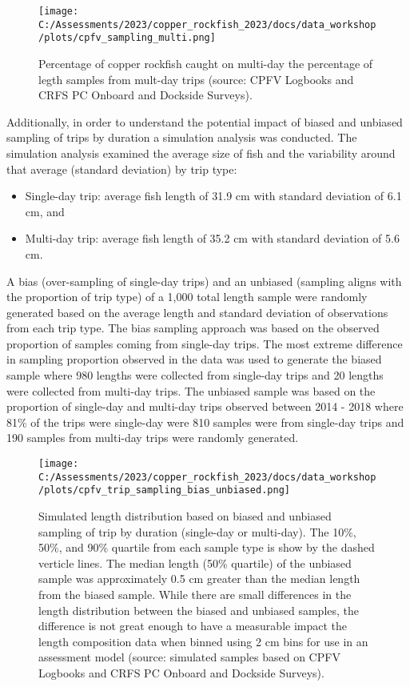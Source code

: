 \documentclass[
]{article}
\providecommand{\tightlist}{%
  \setlength{\itemsep}{0pt}\setlength{\parskip}{0pt}}
\begin{document}
\begin{figure}
\centering
\texttt{[image: C:/Assessments/2023/copper\_rockfish\_2023/docs/data\_workshop/plots/cpfv\_sampling\_multi.png]}
\caption{Percentage of copper rockfish caught on multi-day the
percentage of legth samples from mult-day trips (source: CPFV Logbooks
and CRFS PC Onboard and Dockside Surveys).\label{fig:cpfv-sampling}}
\end{figure}

Additionally, in order to understand the potential impact of biased and
unbiased sampling of trips by duration a simulation analysis was
conducted. The simulation analysis examined the average size of fish and
the variability around that average (standard deviation) by trip type:

\begin{itemize}
\tightlist
\item
  Single-day trip: average fish length of 31.9 cm with standard
  deviation of 6.1 cm, and
\item
  Multi-day trip: average fish length of 35.2 cm with standard deviation
  of 5.6 cm.
\end{itemize}

A bias (over-sampling of single-day trips) and an unbiased (sampling
aligns with the proportion of trip type) of a 1,000 total length sample
were randomly generated based on the average length and standard
deviation of observations from each trip type. The bias sampling
approach was based on the observed proportion of samples coming from
single-day trips. The most extreme difference in sampling proportion
observed in the data was used to generate the biased sample where 980
lengths were collected from single-day trips and 20 lengths were
collected from multi-day trips. The unbiased sample was based on the
proportion of single-day and multi-day trips observed between 2014 -
2018 where 81\% of the trips were single-day were 810 samples were from
single-day trips and 190 samples from multi-day trips were randomly
generated.

\begin{figure}
\centering
\texttt{[image: C:/Assessments/2023/copper\_rockfish\_2023/docs/data\_workshop/plots/cpfv\_trip\_sampling\_bias\_unbiased.png]}
\caption{Simulated length distribution based on biased and unbiased
sampling of trip by duration (single-day or multi-day). The 10\%, 50\%,
and 90\% quartile from each sample type is show by the dashed verticle
lines. The median length (50\% quartile) of the unbiased sample was
approximately 0.5 cm greater than the median length from the biased
sample. While there are small differences in the length distribution
between the biased and unbiased samples, the difference is not great
enough to have a measurable impact the length composition data when
binned using 2 cm bins for use in an assessment model (source: simulated
samples based on CPFV Logbooks and CRFS PC Onboard and Dockside
Surveys).\label{fig:cpfv-sim-sample}}
\end{figure}
\end{document}

